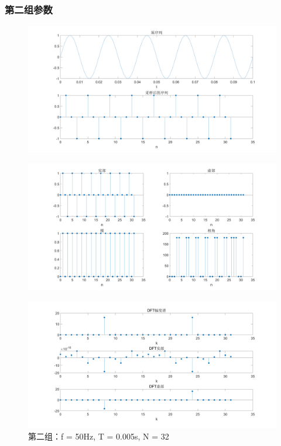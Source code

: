 \documentclass{../source/Experiment copy}
\begin{document}
\subsubsection{第二组参数}
\begin{figure}[H]
    \centering
    \includegraphics[width = \textwidth]{src/exp2_2_1.png}
\end{figure}

\begin{figure}[H]
    \centering
    \includegraphics[width = \textwidth]{src/exp2_2_2.png}
\end{figure}

\begin{figure}[H]
    \centering
    \includegraphics[width = \textwidth]{src/exp2_2_3.png}
    \caption{第二组：f = 50Hz, T = 0.005s, N = 32}
\end{figure}
\end{document}
